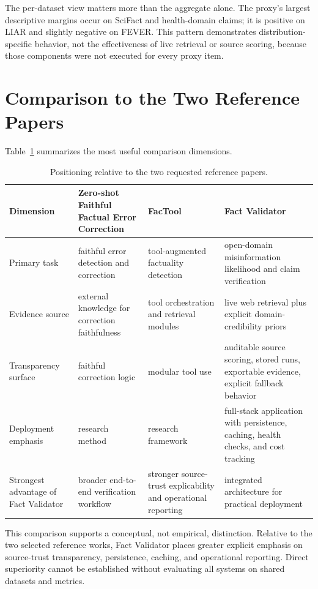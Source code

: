 \documentclass[conference]{IEEEtran}
\begin{document}
The per-dataset view matters more than the aggregate alone. The proxy's largest descriptive margins occur on SciFact and health-domain claims; it is positive on LIAR and slightly negative on FEVER. This pattern demonstrates distribution-specific behavior, not the effectiveness of live retrieval or source scoring, because those components were not executed for every proxy item.

\section{Comparison to the Two Reference Papers}

Table~\ref{tab:comparepapers} summarizes the most useful comparison dimensions.

\begin{table}[t]
\centering
\caption{Positioning relative to the two requested reference papers.}
\label{tab:comparepapers}
\footnotesize
\renewcommand{\arraystretch}{1.12}
\begin{tabularx}{\textwidth}{>{\raggedright\arraybackslash}p{2.2cm} >{\raggedright\arraybackslash}X >{\raggedright\arraybackslash}X >{\raggedright\arraybackslash}X}
\toprule
Dimension & Zero-shot Faithful Factual Error Correction & FacTool & Fact Validator \\
\midrule
Primary task & faithful error detection and correction & tool-augmented factuality detection & open-domain misinformation likelihood and claim verification \\
Evidence source & external knowledge for correction faithfulness & tool orchestration and retrieval modules & live web retrieval plus explicit domain-credibility priors \\
Transparency surface & faithful correction logic & modular tool use & auditable source scoring, stored runs, exportable evidence, explicit fallback behavior \\
Deployment emphasis & research method & research framework & full-stack application with persistence, caching, health checks, and cost tracking \\
Strongest advantage of Fact Validator & broader end-to-end verification workflow & stronger source-trust explicability and operational reporting & integrated architecture for practical deployment \\
\bottomrule
\end{tabularx}
\end{table}

This comparison supports a conceptual, not empirical, distinction. Relative to the two selected reference works, Fact Validator places greater explicit emphasis on source-trust transparency, persistence, caching, and operational reporting. Direct superiority cannot be established without evaluating all systems on shared datasets and metrics.
\end{document}
